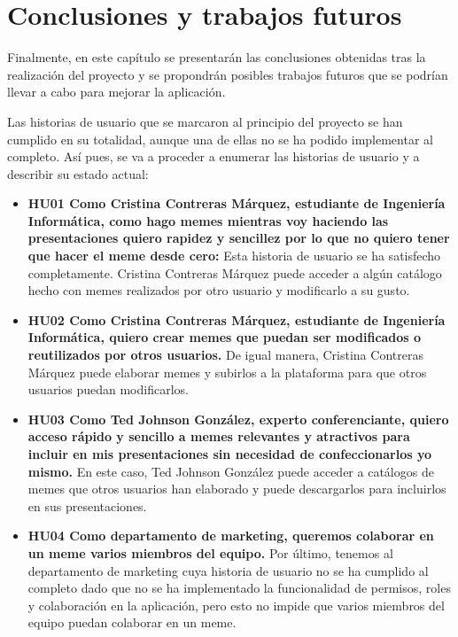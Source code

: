 \chapter{Conclusiones y trabajos futuros}

Finalmente, en este capítulo se presentarán las conclusiones obtenidas tras la realización del proyecto y se propondrán posibles trabajos futuros que se podrían llevar a cabo para mejorar la aplicación.

Las historias de usuario que se marcaron al principio del proyecto se han cumplido en su totalidad, aunque una de ellas no se ha podido implementar al completo. Así pues, se va a proceder a enumerar las historias de usuario y a describir su estado actual:

\begin{itemize}
  \item[\bien] \textbf{HU01 Como Cristina Contreras Márquez, estudiante de Ingeniería Informática, como hago memes mientras voy haciendo las presentaciones quiero rapidez y sencillez por lo que no quiero tener que hacer el meme desde cero:} Esta historia de usuario se ha satisfecho completamente. Cristina Contreras Márquez puede acceder a algún catálogo hecho con memes realizados por otro usuario y modificarlo a su gusto.
  \item[\bien] \textbf{HU02 Como Cristina Contreras Márquez, estudiante de Ingeniería Informática, quiero crear memes que puedan ser modificados o reutilizados por otros usuarios.} De igual manera, Cristina Contreras Márquez puede elaborar memes y subirlos a la plataforma para que otros usuarios puedan modificarlos.
  \item[\bien] \textbf{HU03 Como Ted Johnson González, experto conferenciante, quiero acceso rápido y sencillo a memes relevantes y atractivos para incluir en mis presentaciones sin necesidad de confeccionarlos yo mismo.} En este caso, Ted Johnson González puede acceder a catálogos de memes que otros usuarios han elaborado y puede descargarlos para incluirlos en sus presentaciones.
  \item[\regular] \textbf{HU04 Como departamento de marketing, queremos colaborar en un meme varios miembros del equipo.} Por último, tenemos al departamento de marketing cuya historia de usuario no se ha cumplido al completo dado que no se ha implementado la funcionalidad de permisos, roles y colaboración en la aplicación, pero esto no impide que varios miembros del equipo puedan colaborar en un meme.
\end{itemize}


